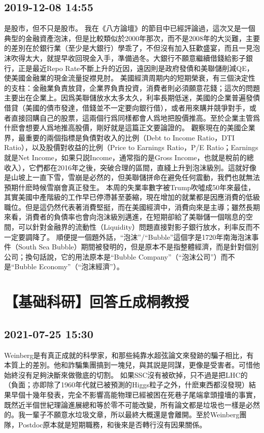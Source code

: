 \documentclass[twocolumn]{ctexart}
\begin{document}
\subsection*{2019-12-08 14:55}

是股市，但不只是股市。 
我在《八方論壇》的節目中已經評論過，這次又是一個典型的金融資產泡沫，但是比較類似於2000年那次，而不是2008年的大災難，主要的差別在於銀行業（至少是大銀行）學乖了，不但沒有加入狂歡盛宴，而且一見泡沫吹得太大，就提早收回現金入手，準備過冬。大銀行不願意繼續借錢給影子銀行，正是最近Repo Rate不斷上升的近因，遠因則是政府發債和美聯儲削減QE，使美國金融業的現金流量捉襟見肘。 
美國經濟周期内的短期榮衰，有三個決定性的支柱：金融業負責放貸，企業界負責投資，消費者則必須願意花錢；這次的問題主要出在企業上。因爲美聯儲放水太多太久，利率長期低迷，美國的企業普遍發債借貸（美國的債市發達，借錢並不一定要向銀行借），或者用來購并競爭對手，或者直接回購自己的股票，這兩個行爲同樣都會人爲地把股價推高。至於企業主管爲什麽會想要人爲地推高股價，剛好就是這篇正文要論證的。 
觀察現在的美國企業界，最重要的兩個指標是負債對收入的比例（Debt to Income Ratio，DTI Ratio），以及股價對收益的比例（Price to Earnings Ratio，P/E Ratio；Earnings就是Net Income，如果只説Income，通常指的是Gross Income，也就是稅前的總收入），它們都在2016年之後，突破合理的區間，直綫上升到泡沫級別。這就好像是山坡上一直下雪，雪崩是必然的，但美聯儲拼命在避免任何震動，我們也就無法預期什麽時候雪崩會真正發生。 
本周的失業率數字被Trump吹噓成50年來最佳，其實美國中產階級的工作早已停滯甚至萎縮，現在增加的就業都是因應消費的低級職位。但是這仍然代表著消費堅挺，而在美國經濟中，消費向來是主導；雖然長期來看，消費者的負債率也會向泡沫級別邁進，在短期卻給了美聯儲一個喘息的空間，可以針對金融界的流動性（Liquidity）問題直接對影子銀行放水，利率反而不一定要調降了。 
順便提一個題外話，“泡沫”/“Bubble”這個字是1720年南海泡沫事件（South Sea Bubble）期間被發明的，但是原本不是指整體經濟，而是針對個別公司；換句話說，它的用法原本是“Bubble Company”（“泡沫公司”）而不是“Bubble Economy”（“泡沫經濟”）。
\section*{【基础科研】回答丘成桐教授}
\subsection*{2021-07-25 15:30}

Weinberg是有真正成就的科學家，和那些純靠水超弦論文來發跡的騙子相比，有本質上的差別。他和詐騙集團搞到一塊兒，與其説是同謀，更像是受害者。可惜他始終沒有足夠決斷來做徹底的切割。
如果SSC沒有被砍掉，只不過是把LHC的（負面；亦即除了1960年代就已被預測的Higgs粒子之外，什麽東西都沒發現）結果早個十幾年發表，完全不影響高能物理已經被困在死巷子尾端拿頭撞墻的事實，既然近半個世紀理論進展總和等於零不可能改變，所有論文都是垃圾也一樣是必然的。我一輩子不願意水垃圾文章，所以最終大概還是會離開。至於Weinberg團隊，Postdoc原本就是短期職務，和後來是否轉行沒有因果關係。
\end{document}
